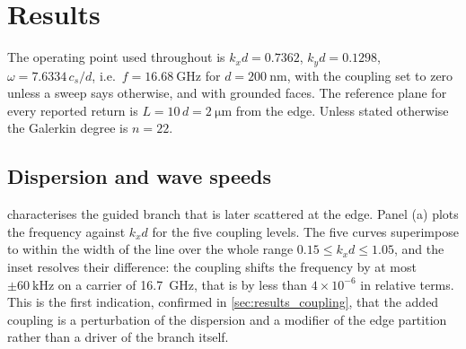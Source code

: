 \section{Results}
\label{sec:results}

The operating point used throughout is
$k_xd=0.7362$, $k_yd=0.1298$, $\omega=7.6334\,c_s/d$, i.e.\
$f=\SI{16.68}{\giga\hertz}$ for $d=\SI{200}{\nano\metre}$, with the coupling
set to zero unless a sweep says otherwise, and with grounded faces.  The
reference plane for every reported return is $L=10\,d=\SI{2}{\micro\metre}$ from
the edge.  Unless stated otherwise the Galerkin degree is $n=22$.

\subsection{Dispersion and wave speeds}
\label{sec:results_dispersion}

 characterises the guided branch that is later scattered at the
edge.  Panel (a) plots the frequency against $k_xd$ for the five coupling
levels.  The five curves superimpose to within the width of the line over the
whole range $0.15\le k_xd\le1.05$, and the inset resolves their difference: the
coupling shifts the frequency by at most $\pm\SI{60}{\kilo\hertz}$ on a carrier
of \SI{16.7}{\giga\hertz}, that is by less than $4\times10^{-6}$ in relative
terms.  This is the first indication, confirmed in \cref{sec:results_coupling},
that the added coupling is a perturbation of the dispersion and a modifier of
the edge partition rather than a driver of the branch itself.

